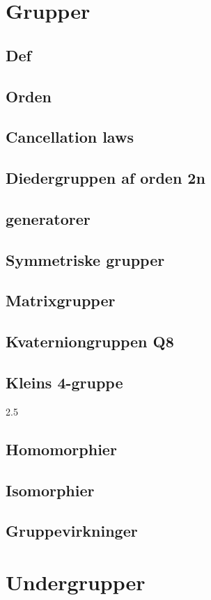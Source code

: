 \documentclass[11pt]{article}
\begin{document}
\section*{Grupper}
\subsection*{Def}
\subsection*{Orden}
\subsection*{Cancellation laws}
\subsection*{Diedergruppen af orden 2n}
\subsection*{generatorer}
\subsection*{Symmetriske grupper}
\subsection*{Matrixgrupper}
\subsection*{Kvaterniongruppen Q8}
\subsection*{Kleins 4-gruppe}
2.5
\subsection*{Homomorphier}
\subsection*{Isomorphier}
\subsection*{Gruppevirkninger}

\section*{Undergrupper}
\end{document}
